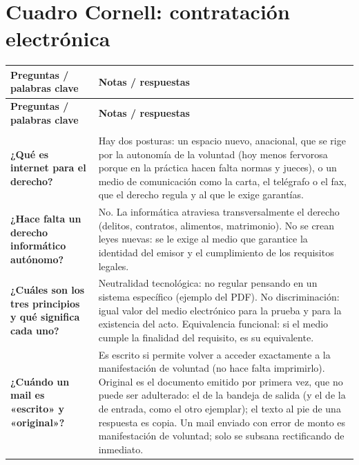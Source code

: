\documentclass[12pt,oneside]{book}
\begin{document}
\section{Cuadro Cornell: contratación electrónica}

\begin{longtable}{@{}
    >{\raggedright\arraybackslash}p{}
    >{\raggedright\arraybackslash}p{}@{}}
\toprule
\textbf{Preguntas / palabras clave} & \textbf{Notas / respuestas} \\
\midrule
\endfirsthead
\toprule
\textbf{Preguntas / palabras clave} & \textbf{Notas / respuestas} \\
\midrule
\endhead
\midrule
\multicolumn{2}{r}{\small\textit{continúa en la página siguiente}} \\
\endfoot
\bottomrule
\endlastfoot

\textbf{¿Qué es internet para el derecho?} &
Hay dos posturas: un espacio nuevo, anacional, que se rige por la autonomía de la voluntad (hoy menos fervorosa porque en la práctica hacen falta normas y jueces), o un medio de comunicación como la carta, el telégrafo o el fax, que el derecho regula y al que le exige garantías. \\[0.6em]

\textbf{¿Hace falta un derecho informático autónomo?} &
No. La informática atraviesa transversalmente el derecho (delitos, contratos, alimentos, matrimonio). No se crean leyes nuevas: se le exige al medio que garantice la identidad del emisor y el cumplimiento de los requisitos legales. \\[0.6em]

\textbf{¿Cuáles son los tres principios y qué significa cada uno?} &
Neutralidad tecnológica: no regular pensando en un sistema específico (ejemplo del PDF). No discriminación: igual valor del medio electrónico para la prueba y para la existencia del acto. Equivalencia funcional: si el medio cumple la finalidad del requisito, es su equivalente. \\[0.6em]

\textbf{¿Cuándo un mail es «escrito» y «original»?} &
Es escrito si permite volver a acceder exactamente a la manifestación de voluntad (no hace falta imprimirlo). Original es el documento emitido por primera vez, que no puede ser adulterado: el de la bandeja de salida (y el de la de entrada, como el otro ejemplar); el texto al pie de una respuesta es copia. Un mail enviado con error de monto es manifestación de voluntad; solo se subsana rectificando de inmediato. \\[0.6em]


\end{longtable}
\end{document}
